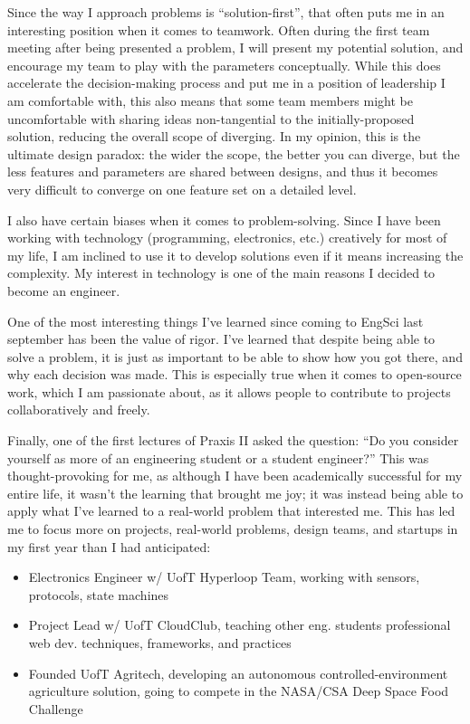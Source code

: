 \documentclass{report}
\begin{document}
Since the way I approach problems is “solution-first”, that often puts 
me in an interesting position when it comes to teamwork. Often during 
the first team meeting after being presented a problem, I will present 
my potential solution, and encourage my team to play with the parameters 
conceptually. While this does accelerate the decision-making process and 
put me in a position of leadership I am comfortable with, this also means 
that some team members might be uncomfortable with sharing ideas non-tangential 
to the initially-proposed solution, reducing the overall scope of diverging. 
In my opinion, this is the ultimate design paradox: the wider the scope, 
the better you can diverge, but the less features and parameters are 
shared between designs, and thus it becomes very difficult to converge 
on one feature set on a detailed level.

I also have certain biases when it comes to problem-solving. Since I have 
been working with technology (programming, electronics, etc.) creatively 
for most of my life, I am inclined to use it to develop solutions even 
if it means increasing the complexity. My interest in technology is one 
of the main reasons I decided to become an engineer.

One of the most interesting things I’ve learned since coming to EngSci 
last september has been the value of rigor. I’ve learned that despite being 
able to solve a problem, it is just as important to be able to show how 
you got there, and why each decision was made. This is especially true when 
it comes to open-source work, which I am passionate about, as it allows 
people to contribute to projects collaboratively and freely.

Finally, one of the first lectures of Praxis II asked the question: “Do you 
consider yourself as more of an engineering student or a student engineer?” 
This was thought-provoking for me, as although I have been academically 
successful for my entire life, it wasn’t the learning that brought me joy; 
it was instead being able to apply what I’ve learned to a real-world problem 
that interested me. This has led me to focus more on projects, real-world 
problems, design teams, and startups in my first year than I had anticipated:
\begin{itemize}
    \item Electronics Engineer w/ UofT Hyperloop Team, working with sensors, 
    protocols, state machines
    \item Project Lead w/ UofT CloudClub, teaching other eng. students professional 
    web dev. techniques, frameworks, and practices
    \item Founded UofT Agritech, developing an autonomous controlled-environment 
    agriculture solution, going to compete in the NASA/CSA Deep Space Food Challenge
\end{itemize}
\end{document}

